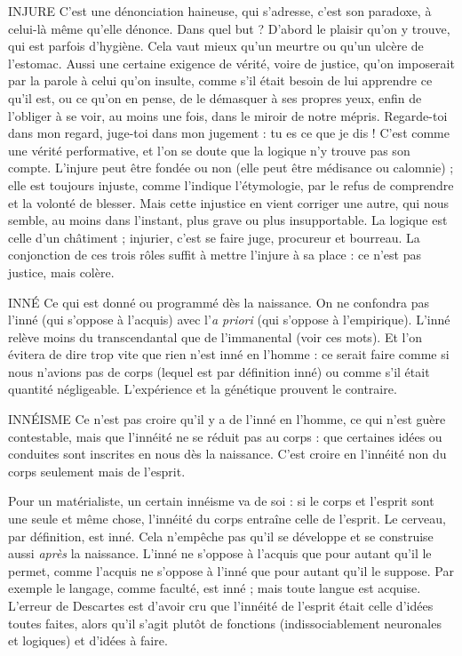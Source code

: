 INJURE C'est une dénonciation haineuse, qui s'adresse, c’est son paradoxe,
à celui-là même qu’elle dénonce. Dans quel but ? D'abord le plaisir
qu’on y trouve, qui est parfois d’hygiène. Cela vaut mieux qu’un meurtre ou
qu’un ulcère de l’estomac. Aussi une certaine exigence de vérité, voire de justice,
qu’on imposerait par la parole à celui qu’on insulte, comme s’il était
besoin de lui apprendre ce qu’il est, ou ce qu’on en pense, de le démasquer à
ses propres yeux, enfin de l’obliger à se voir, au moins une fois, dans le miroir
de notre mépris. Regarde-toi dans mon regard, juge-toi dans mon jugement :
tu es ce que je dis ! C’est comme une vérité performative, et l’on se doute que
la logique n’y trouve pas son compte. L’injure peut être fondée ou non (elle
peut être médisance ou calomnie) ; elle est toujours injuste, comme l'indique
l’étymologie, par le refus de comprendre et la volonté de blesser. Mais cette
injustice en vient corriger une autre, qui nous semble, au moins dans l'instant,
plus grave ou plus insupportable. La logique est celle d’un châtiment ; injurier,
c’est se faire juge, procureur et bourreau. La conjonction de ces trois rôles suffit
à mettre l’injure à sa place : ce n’est pas justice, mais colère.

INNÉ Ce qui est donné ou programmé dès la naissance. On ne confondra
pas l’inné (qui s’oppose à l’acquis) avec l’{\it a priori} (qui s’oppose à l'empirique).
L’inné relève moins du transcendantal que de l’immanental (voir ces mots).
Et l’on évitera de dire trop vite que rien n’est inné en l’homme : ce serait faire
comme si nous n'avions pas de corps (lequel est par définition inné) ou comme s’il
était quantité négligeable. L'expérience et la génétique prouvent le contraire.

INNÉISME Ce n’est pas croire qu’il y a de l’inné en l’homme, ce qui n’est
guère contestable, mais que l’innéité ne se réduit pas au corps :
que certaines idées ou conduites sont inscrites en nous dès la naissance. C’est
croire en l’innéité non du corps seulement mais de l'esprit.

Pour un matérialiste, un certain innéisme va de soi : si le corps et l'esprit
sont une seule et même chose, l’innéité du corps entraîne celle de l’esprit. Le
cerveau, par définition, est inné. Cela n'empêche pas qu’il se développe et se
construise aussi {\it après} la naissance. L’inné ne s’oppose à l’acquis que pour autant
qu'il le permet, comme l’acquis ne s'oppose à l’inné que pour autant qu’il le
suppose. Par exemple le langage, comme faculté, est inné ; mais toute langue
est acquise. L'erreur de Descartes est d’avoir cru que l’innéité de l'esprit était
celle d’idées toutes faites, alors qu’il s’agit plutôt de fonctions (indissociablement
neuronales et logiques) et d’idées à faire.

